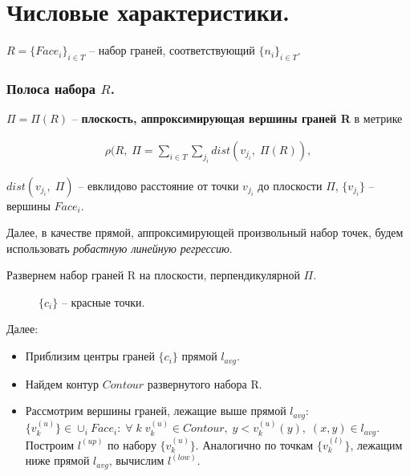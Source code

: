 \chapter{Числовые характеристики.}

\noindent$R = \{ Face_i \}_{i \in T}$ -- набор граней, соответствующий $\{ n_i\}_{i \in T}$.

\subsection*{\Large{Полоса набора $R$}.}

\begin{definition}
	$\Pi = \Pi(R)$ -- {\color{Black} \textbf{плоскость, аппроксимирующая вершины граней R}} в метрике 

	$$\begin{gathered}
			\rho(R, \; \Pi = \sum\limits_{i \in T}\sum\limits_{j_i}dist(v_{j_i}, \; \Pi(R)),
		\end{gathered}$$

	 $dist(v_{j_i}, \; \Pi)$ -- евклидово расстояние от точки $v_{j_i}$ до плоскости $\Pi$, $\{ v_{j_i} \} $ -- вершины $Face_i$.

\end{definition}

\begin{remark}
	Далее, в качестве прямой, аппроксимирующей произвольный набор точек, будем использовать \textit{робастную линейную регрессию}.
\end{remark}

Развернем набор граней R на плоскости, перпендикулярной $\Pi$. 
\begin{figure}[h!]
\caption{$\{ c_i\}$ -- красные точки.}
\end{figure}\newpage

Далее:
\begin{itemize}
	\item Приблизим центры граней $\{ c_i\}$ прямой $l_{avg}$.
	\item Найдем контур $Contour$ развернутого набора R.
	\item Рассмотрим вершины граней, лежащие выше прямой $l_{avg}$: $\{ v_k^{(u)}\} \in \cup_i Face_i: \; \forall \; k \; v_k^{(u)} \in Contour, \; y < v_k^{(u)}(y), \; (x, y) \in l_{avg}.$ Построим $l^{(up)}$ по набору  $\{ v_k^{(u)}\}$. Аналогично по точкам $\{ v_k^{(l)}\}$, лежащим ниже прямой $l_{avg}$, вычислим $l^{(low)}$.
\end{itemize}

